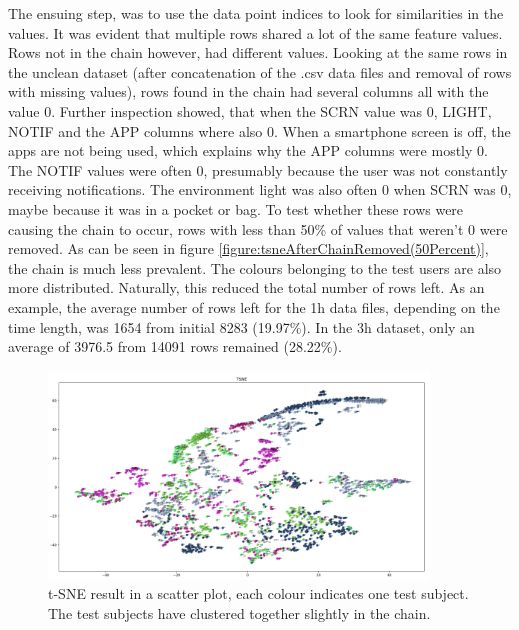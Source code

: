 The ensuing step, was to use the data point indices to look for similarities in the values. It was evident that multiple rows shared a lot of the same feature values. Rows not in the chain however, had different values. Looking at the same rows in the unclean dataset (after concatenation of the .csv data files and removal of rows with missing values), rows found in the chain had several columns all with the value 0. Further inspection showed, that when the SCRN value was 0, LIGHT, NOTIF and the APP columns where also 0. When a smartphone screen is off, the apps are not being used, which explains why the APP columns were mostly 0. The NOTIF values were often 0, presumably because the user was not constantly receiving notifications. The environment light was also often 0 when SCRN was 0, maybe because it was in a pocket or bag. To test whether these rows were causing the chain to occur, rows with less than 50\% of values that weren't 0 were removed. As can be seen in figure \ref{figure:tsneAfterChainRemoved(50Percent)}, the chain is much less prevalent. The colours belonging to the test users are also more distributed. Naturally, this reduced the total number of rows left. As an example, the average number of rows left for the 1h data files, depending on the time length, was 1654 from initial 8283 (19.97\%). In the 3h dataset, only an average of 3976.5 from 14091 rows remained (28.22\%).





\begin{figure}[h]
  \centering
  \includegraphics[width=0.9\textwidth]{./images/tsneTestSubjectsColor.png}
  \caption{t-SNE result in a scatter plot, each colour indicates one test subject. The test subjects have clustered together slightly in the chain.}
  \label{figure:tsneTestSubjectsColor}
\end{figure}

